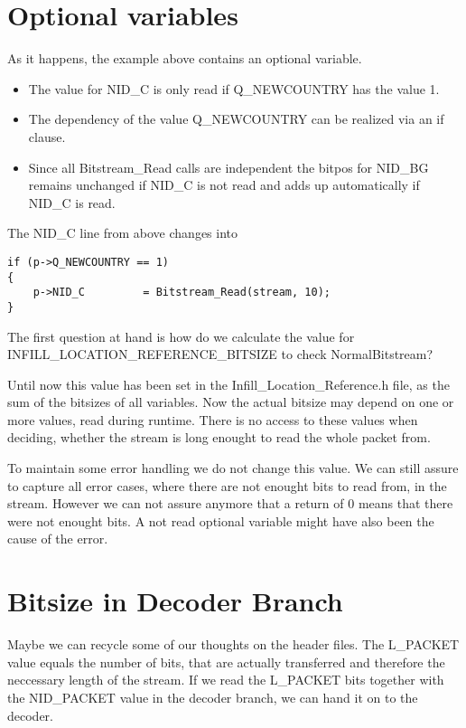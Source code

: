 \documentclass[parskip=half,paper=a4,DIV=13]{scrartcl}
\begin{document}
\section{Optional variables}

As it happens, the example above contains an optional variable.

\begin{itemize}

\item
The value for NID\_C is only read if Q\_NEWCOUNTRY has the value 1.
\item
The dependency of the value Q\_NEWCOUNTRY can be realized via an if clause.
\item
Since all Bitstream\_Read calls are independent the bitpos for NID\_BG remains unchanged
if NID\_C is not read and adds up automatically if NID\_C is read.

\end{itemize}

The NID\_C line from above changes into

\begin{lstlisting}[mathescape]
if (p->Q_NEWCOUNTRY == 1)
{
    p->NID_C         = Bitstream_Read(stream, 10);
}
\end{lstlisting}

The first question at hand is how do we calculate the value for INFILL\_LOCATION\_REFERENCE\_BITSIZE
to check NormalBitstream?

Until now this value has been set in the Infill\_Location\_Reference.h file, as the sum of the bitsizes
of all variables.
Now the actual bitsize may depend on one or more values, read during runtime.
There is no access to these values when deciding, whether the stream is long enought to read the whole packet from.

To maintain some error handling we do not change this value.
We can still assure to capture all error cases, where there are not enought bits to read from, in the stream.
However we can not assure anymore that a return of 0 means that there were not enought bits.
A not read optional variable might have also been the cause of the error.

\section{Bitsize in Decoder Branch}

Maybe we can recycle some of our thoughts on the header files. The L\_PACKET value equals the number
of bits, that are actually transferred and therefore the neccessary length of the stream.
If we read the L\_PACKET bits together with the NID\_PACKET value in the decoder branch,
we can hand it on to the decoder.
\end{document}
